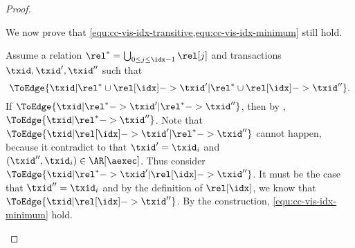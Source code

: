 \begin{toappendix}
\begin{proof}
\begin{enumerate}
    We now prove that \cref{equ:cc-vis-idx-transitive,equ:cc-vis-idx-minimum} still hold.
    \begin{enumerate}
        Assume a relation \( \rel^* = \bigcup_{0 \leq j \leq \idx-1 } \rel[j] \) 
        and transactions \( \txid, \txid',\txid'' \) such that 
        \[
            \ToEdge{\txid | \rel^* \cup \rel[\idx] -> \txid' | \rel^* \cup \rel[\idx] -> \txid'' } .
        \]
        If \( \ToEdge{\txid | \rel^*  -> \txid' | \rel^*  -> \txid'' } \), 
        then by \ih, \( \ToEdge{\txid | \rel^*  -> \txid'' } \).
        Note that \( \ToEdge{\txid | \rel[\idx]  -> \txid' | \rel^*  -> \txid'' } \) cannot happen,
        because it contradict to that \( \txid' = \txid_i\) and \( (\txid'',\txid_i) \in \AR[\aexec] \).
        Thus consider \( \ToEdge{\txid | \rel^*  -> \txid' | \rel[\idx]  -> \txid'' } \).
        It must be the case that \( \txid'' = \txid_i \) and by the definition of \( \rel[\idx] \),
        we know that \( \ToEdge{\txid | \rel[\idx]  -> \txid'' } \).
        By the construction, \cref{equ:cc-vis-idx-minimum} hold. \qedhere
    \end{enumerate}
\end{enumerate}
\end{proof}
\end{toappendix}

